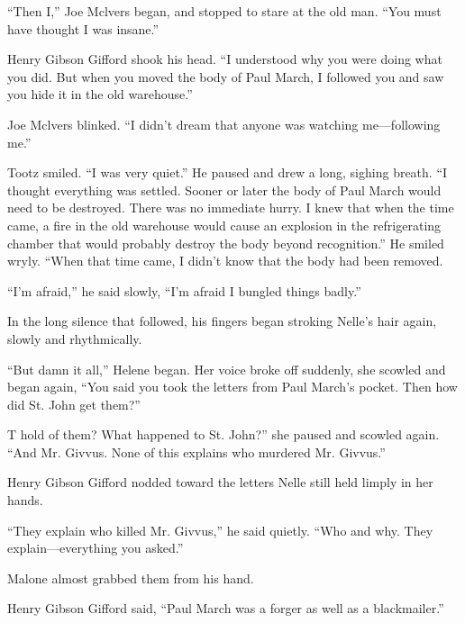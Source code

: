 \documentclass{novel}
\begin{document}
“Then I,” Joe Mclvers began, and stopped to stare at the old man. “You must have thought I was insane.”

Henry Gibson Gifford shook his head. “I understood why you were doing what you did. But when you moved the body of Paul March, I followed you and saw you hide it in the old warehouse.”

Joe Mclvers blinked. “I didn’t dream that anyone was watching me—following me.”

Tootz smiled. “I was very quiet.” He paused and drew a long, sighing breath. “I thought everything was settled. Sooner or later the body of Paul March would need to be destroyed. There was no immediate hurry. I knew that when the time came, a fire in the old warehouse would cause an explosion in the refrigerating chamber that would probably destroy the body beyond recognition.” He smiled wryly. “When that time came, I didn’t know that the body had been removed.

“I’m afraid,” he said slowly, “I’m afraid I bungled things badly.”

In the long silence that followed, his fingers began stroking Nelle’s hair again, slowly and rhythmically.

“But damn it all,” Helene began. Her voice broke off suddenly, she scowled and began again, “You said you took the letters from Paul March’s pocket. Then how did St. John get them?”

T hold of them? What happened to St. John?” she paused and scowled again. “And Mr. Givvus. None of this explains who murdered Mr. Givvus.”

Henry Gibson Gifford nodded toward the letters Nelle still held limply in her hands.

“They explain who killed Mr. Givvus,” he said quietly. “Who and why. They explain—everything you asked.”

\begin{ChapterStart}
\vspace{3\nbs}
\end{ChapterStart}

Malone almost grabbed them from his hand.

Henry Gibson Gifford said, “Paul March was a forger as well as a blackmailer.”
\end{document}
